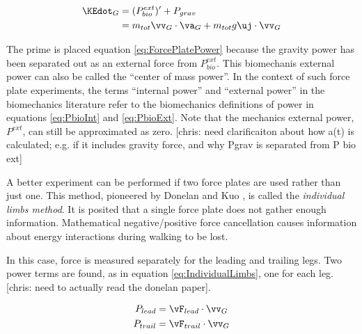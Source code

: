 \begin{align}
\KEdot_{G} &= (P_{bio}^{ext})^{\prime} + P_{grav} \notag \\
&= m_{tot} \vv_{G} \cdot \va_{G} + m_{tot} g \uj \cdot \vv_{G} \label{eq:ForcePlatePower} \\
\end{align}

The prime is placed equation \ref{eq:ForcePlatePower} because the gravity power has been separated out as an external force from $P_{bio}^{ext}$. This biomechanis external power can also be called the ``center of mass power''. In the context of such force plate experiments, the terms ``internal power'' and ``external power'' in the biomechanics literature refer to the biomechanics definitions of power in equations \ref{eq:PbioInt} and \ref{eq:PbioExt}. Note that the mechanics external power, $P^{ext}$, can still be approximated as zero. [chris: need clarificaiton about how a(t) is calculated; e.g. if it includes gravity force, and why Pgrav is separated from P bio ext]

A better experiment can be performed if two force plates are used rather than just one. This method, pioneered by Donelan and Kuo \cite{donelan01}, is called the \emph{individual limbs method}. It is posited that a single force plate does not gather enough information. Mathematical negative/positive force cancellation causes information about energy interactions during walking to be lost.

In this case, force is measured separately for the leading and trailing legs. Two power terms are found, as in equation \ref{eq:IndividualLimbs}, one for each leg. [chris: need to actually read the donelan paper].

\begin{align}
P_{lead} &= \vF_{lead} \cdot \vv_{G} \\
P_{trail} &= \vF_{trail} \cdot \vv_{G}
\label{eq:IndividualLimbs}
\end{align}
